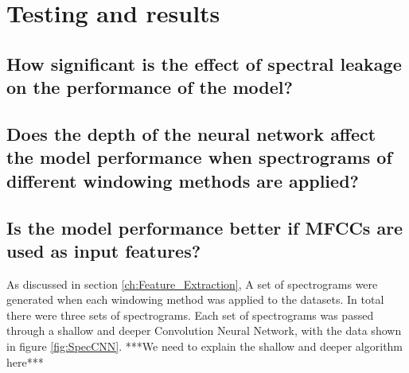 % 
% 
% 
\section{Testing and results \label{ch:T_R}}
\vspace{0.5cm}

\subsection{How significant is the effect of spectral leakage on the performance of the model?}


\subsection{Does the depth of the neural network affect the model performance when spectrograms of different windowing methods are applied?}

\subsection{Is the model performance better if MFCCs are used as input features?}


As discussed in section \ref{ch:Feature_Extraction}, A set of spectrograms were generated when each windowing method was applied to the datasets. In total there were three sets of spectrograms. Each set of spectrograms was passed through a shallow and deeper Convolution Neural Network, with the data shown in figure \ref{fig:SpecCNN}. ***We need to explain the shallow and deeper algorithm here***

